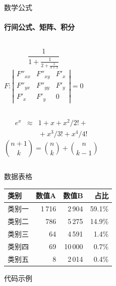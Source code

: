 \begin{frame}[label=math]{数学公式}
  \framesubtitle{行间公式、矩阵、积分}
  \begin{columns}[onlytextwidth]
      $$\frac{1}{\displaystyle 1+
        \frac{1}{\displaystyle 2+
        \frac{1}{\displaystyle 3+x}}}$$
      $$F:\left| \begin{array}{ccc}
      F''_{xx} & F''_{xy} &  F'_x \\
      F''_{yx} & F''_{yy} &  F'_y \\
      F'_x     & F'_y     & 0
      \end{array}\right| = 0$$
  \end{columns}
  \begin{columns}[onlytextwidth]
      \begin{eqnarray*}
        e^x &\approx& 1+x+x^2/2! + \\
            && {}+x^3/3! + x^4/4!
      \end{eqnarray*}
      $${n+1\choose k} = {n\choose k} + {n \choose k-1}$$
  \end{columns}
\end{frame}

\begin{frame}[label=table]{数据表格}
  \begin{tabularx}{\textwidth}{Xrrr}
    \textbf{类别} & \textbf{数值A} & \textbf{数值B} & \textbf{占比} \\
    \toprule
    类别一 & 1\,716  & 2\,904  & 59.1\% \\
    类别二 & 786     & 5\,275  & 14.9\% \\
    类别三 & 64      & 4\,591  &  1.4\% \\
    类别四 & 69      & 10\,000 &  0.7\% \\
    类别五 & 8       & 2\,014  &  0.4\% \\
    \bottomrule
  \end{tabularx}
\end{frame}

\begin{frame}[label=code]{代码示例}
  \codeExample
\end{frame}

